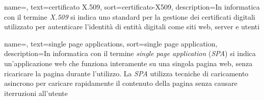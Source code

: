  {
    name=,
    text=certificato X.509,
    sort=certificato-X509,
    description={In informatica con il termine \emph{X.509} si indica uno standard per la gestione dei certificati digitali utilizzato per autenticare l'identità di entità digitali come siti web, server e utenti}
}


 {
    name=,
    text=single page applications,
    sort=single page application,
    description={In informatica con il termine \emph{single page application} (\emph{SPA}) si indica un'applicazione web che funziona interamente su una singola pagina web, senza ricaricare la pagina durante l'utilizzo. La \emph{SPA} utilizza tecniche di caricamento asincrono per caricare rapidamente il contenuto della pagina senza causare iterruzioni all'utente} 
}
